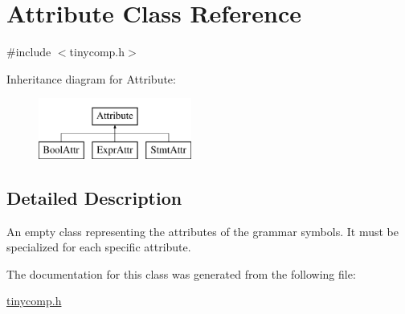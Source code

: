 \hypertarget{class_attribute}{}\section{Attribute Class Reference}
\label{class_attribute}


{\ttfamily \#include $<$tinycomp.\+h$>$}

Inheritance diagram for Attribute\+:\begin{figure}[H]
\begin{center}
\leavevmode
\includegraphics[height=2.000000cm]{class_attribute}
\end{center}
\end{figure}


\subsection{Detailed Description}
An empty class representing the attributes of the grammar symbols. It must be specialized for each specific attribute. 

The documentation for this class was generated from the following file\+:\begin{DoxyCompactItemize}
\item 
\hyperlink{tinycomp_8h}{tinycomp.\+h}\end{DoxyCompactItemize}
